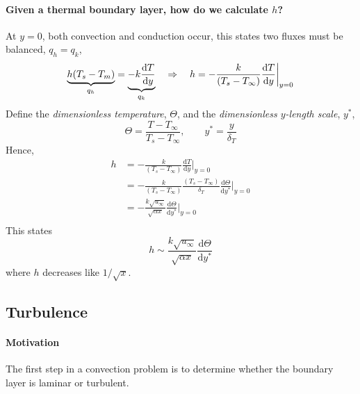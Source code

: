 \documentclass[12pt, a4paper]{article}
\begin{document}
\paragraph{Given a thermal boundary layer, how do we calculate $h$?} At $y=0$, both convection and conduction occur, this states two fluxes must be balanced, $q_h = q_k$,
\[
    \underbrace{h(T_s-T_m)}_{q_h} = \underbrace{-k\frac{\mathrm{d}T}{\mathrm{d}y}}_{q_k} \quad \Rightarrow \quad
    h = -\frac{k}{(T_s - T_\infty)} \frac{\mathrm{d}T}{\mathrm{d}y} \bigg\lvert_{y=0} \\
\]
Define the \textit{dimensionless temperature}, $\Theta$, and the \textit{dimensionless $y$-length scale}, $y^{*}$,
\[
    \Theta = \frac{T-T_\infty}{T_s-T_\infty}, \quad \quad y^{*} = \frac{y}{\delta_T}
\]
Hence,
\begin{align*}
    h 
    & = -\frac{k}{(T_s - T_\infty)} \frac{\mathrm{d}T}{\mathrm{d}y} \bigg\lvert_{y=0} \\
    & = -\frac{k}{(T_s - T_\infty)} \frac{(T_s - T_\infty)}{\delta_T} \frac{\mathrm{d}\Theta}{\mathrm{d}y^{*}} \bigg\lvert_{y=0}\\
    & = -\frac{k\sqrt{u_\infty}}{\sqrt{\alpha x}} \frac{\mathrm{d}\Theta}{\mathrm{d}y^{*}} \bigg\lvert_{y=0}\\
\end{align*}
This states
\[
    h \sim \frac{k\sqrt{u_\infty}}{\sqrt{\alpha x}} \frac{\mathrm{d}\Theta}{\mathrm{d}y^{*}}
\]
where $h$ decreases like $1/\sqrt{x}$.

\subsection{Turbulence}
\paragraph{Motivation} The first step in a convection problem is to determine whether the boundary layer is laminar or turbulent.
\end{document}
